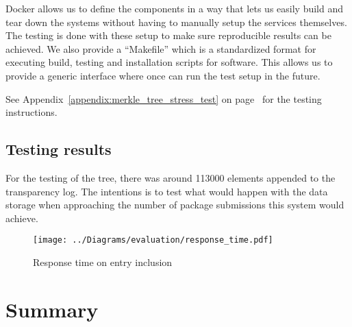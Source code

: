 \documentclass[../Main/thesis.tex]{subfiles}
\begin{document}
Docker allows us to define the components in a way that lets us easily build and
tear down the systems without having to manually setup the services themselves.
The testing is done with these setup to make sure reproducible results can be
achieved. We also provide a ``Makefile'' which is a standardized format for
executing build, testing and installation scripts for software. This allows us
to provide a generic interface where once can run the test setup in the future.

See Appendix~\ref{appendix:merkle_tree_stress_test} on
page~\pageref{appendix:merkle_tree_stress_test} for the testing instructions.

\subsection*{Testing results}%
\label{sub:testing_results}
For the testing of the tree, there was around 113000 elements appended to the
transparency log. The intentions is to test what would happen with the data
storage when approaching the number of package submissions this system would
achieve.


\begin{figure}[H]
\centering
\texttt{[image: ../Diagrams/evaluation/response\_time.pdf]}
\caption{Response time on entry inclusion}
\label{fig:response_time}
\end{figure}







\section{Summary}%
\label{sec:evaluation_summary}


\blankpage
\end{document}
